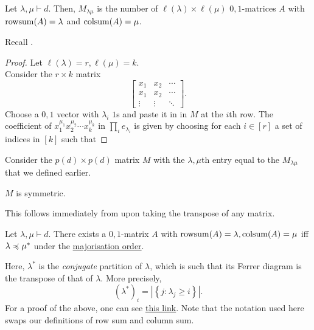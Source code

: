 	\begin{ftheo}
		\label{theo: sol to rowsum colsum}
		Let $\lambda,\mu \vdash d$. Then, $M_{\lambda\mu}$ is the number of $\ell(\lambda) \times \ell(\mu)$ $0,1$-matrices $A$ with $\operatorname{rowsum}(A) = \lambda$ and $\operatorname{colsum}(A) = \mu$.
	\end{ftheo}
	Recall .
	\begin{proof}
		Let $\ell(\lambda) = r, \ell(\mu) = k$.\\
		Consider the $r \times k$ matrix
		\[ \begin{bmatrix} x_1 & x_2 & \cdots \\ x_1 & x_2 & \cdots \\ \vdots & \vdots & \ddots \end{bmatrix}. \]
		Choose a $0,1$ vector with $\lambda_i$ $1$s and paste it in in $M$ at the $i$th row. The coefficient of $x_1^{\mu_1} x_2^{\mu_2} \cdots x_k^{\mu_k}$ in $\prod_i e_{\lambda_i}$ is given by choosing for each $i \in [r]$ a set of indices in $[k]$ such that
	\end{proof}
	
	Consider the $p(d) \times p(d)$ matrix $M$ with the ${\lambda,\mu}$th entry equal to the $M_{\lambda\mu}$ that we defined earlier.
	
	\begin{fcor}
		$M$ is symmetric.
	\end{fcor}
	This follows immediately from  upon taking the transpose of any matrix.

	\begin{ftheo}
		\label{gale-ryser}
		Let $\lambda,\mu \vdash d$. There exists a $0,1$-matrix $A$ with $\operatorname{rowsum}(A) = \lambda,\operatorname{colsum}(A) = \mu$ iff $\lambda \preccurlyeq \mu^*$ under the \hyperref[def: majorisation order]{majorisation order}.
	\end{ftheo}

	Here, $\lambda^*$ is the \emph{conjugate} partition of $\lambda$, which is such that its Ferrer diagram is the transpose of that of $\lambda$. More precisely,
	\[ (\lambda^*)_i = \left| \left\{ j : \lambda_j \ge i \right\} \right|. \]
	For a proof of the above, one can see \href{http://www.math.iitb.ac.in/~krishnan/phd-2022/krause_gale_ryser.pdf}{this link}. Note that the notation used here swaps our definitions of row sum and column sum. %


